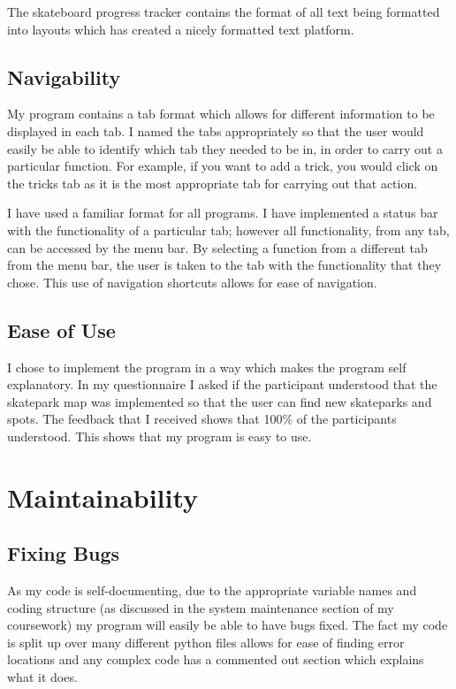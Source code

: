 The skateboard progress tracker contains the format of all text being formatted into layouts which has created a nicely formatted text platform. 

	\subsection{Navigability}

My program contains a tab format which allows for different information to be displayed in each tab. I named the tabs appropriately so that the user would easily be able to identify which tab they needed to be in, in order to carry out a particular function. For example, if you want to add a trick, you would click on the tricks tab as it is the most appropriate tab for carrying out that action.

I have used a familiar format for all programs. I have implemented a status bar with the functionality of a particular tab; however all functionality, from any tab, can be accessed by the menu bar. By selecting a function from a different tab from the menu bar, the user is taken to the tab with the functionality that they chose. This use of navigation shortcuts allows for ease of navigation.

	\subsection{Ease of Use}

I chose to implement the program in a way which makes the program self explanatory. In my questionnaire I asked if the participant understood that the skatepark map was implemented so that the user can find new skateparks and spots. The feedback that I received shows that 100\% of the participants understood. This shows that my program is easy to use.








\section{Maintainability} %

	\subsection{Fixing Bugs}

As my code is self-documenting, due to the appropriate variable names and coding structure (as discussed in the system maintenance section of my coursework) my program will easily be able to have bugs fixed. The fact my code is split up over many different python files allows for ease of finding error locations and any complex code has a commented out section which explains what it does.

